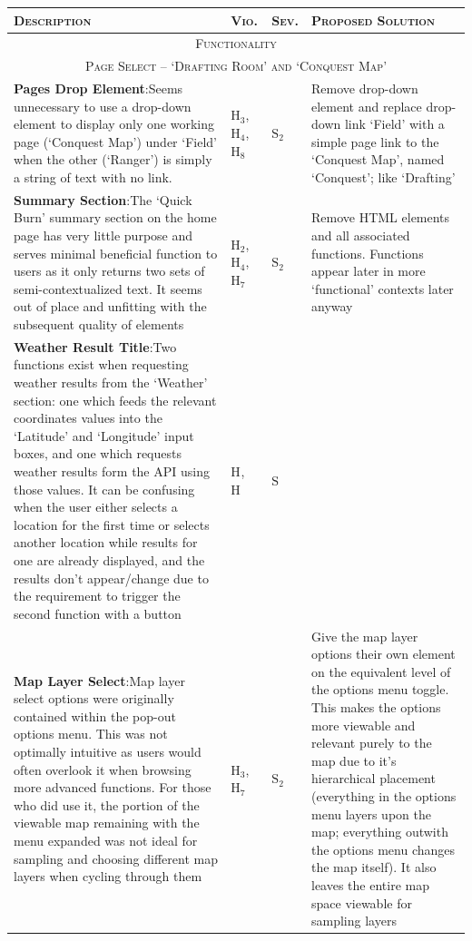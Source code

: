 \documentclass[11pt, english]{article}
\begin{document}
	\begin{center}
                \scriptsize
        \begin{longtable}{p{7.5cm}p{0.5cm}p{0.5cm}p{4cm}}
                \textsc{Description} & \textsc{Vio.} & \textsc{Sev.} & \textsc{Proposed Solution}\\
                \hline
		\hline
		\multicolumn{4}{c}{\textsc{Functionality}}\\
		\hline
		\hline
		\multicolumn{4}{c}{\textsc{Page Select -- `Drafting Room' and `Conquest Map'}}\\
		\hline
		\textbf{Pages Drop Element}:\newline Seems unnecessary to use a drop-down element to display only one working page (`Conquest Map') under `Field' when the other (`Ranger') is simply a string of text with no link. & $\mathrm{H_{3}}$, $\mathrm{H_{4}}$, $\mathrm{H_{8}}$ & $\mathrm{S_{2}}$ & Remove drop-down element and replace drop-down link `Field' with a simple page link to the `Conquest Map', named `Conquest'; like `Drafting'\\
		\textbf{Summary Section}:\newline The `Quick Burn' summary section on the home page has very little purpose and serves minimal beneficial function to users as it only returns two sets of semi-contextualized text. It seems out of place and unfitting with the subsequent quality of elements & $\mathrm{H_{2}}$, $\mathrm{H_{4}}$, $\mathrm{H_{7}}$ & $\mathrm{S_{2}}$ & Remove HTML elements and all associated functions. Functions appear later in more `functional' contexts later anyway\\
		\textbf{Weather Result Title}:\newline Two functions exist when requesting weather results from the `Weather' section: one which feeds the relevant coordinates values into the `Latitude' and `Longitude' input boxes, and one which requests weather results form the API using those values. It can be confusing when the user either selects a location for the first time or selects another location while results for one are already displayed, and the results don't appear/change due to the requirement to trigger the second function with a button & $\mathrm{H_{}}$, $\mathrm{H_{}}$ & $\mathrm{S_{}}$ & \\
		\textbf{Map Layer Select}:\newline Map layer select options were originally contained within the pop-out options menu. This was not optimally intuitive as users would often overlook it when browsing more advanced functions. For those who did use it, the portion of the viewable map remaining with the menu expanded was not ideal for sampling and choosing different map layers when cycling through them & $\mathrm{H_{3}}$, $\mathrm{H_{7}}$ & $\mathrm{S_{2}}$ & Give the map layer options their own element on the equivalent level of the options menu toggle. This makes the options more viewable and relevant purely to the map due to it's hierarchical placement (everything in the options menu layers upon the map; everything outwith the options menu changes the map itself). It also leaves the entire map space viewable for sampling layers\\

\end{longtable}
\end{center}
\end{document}
